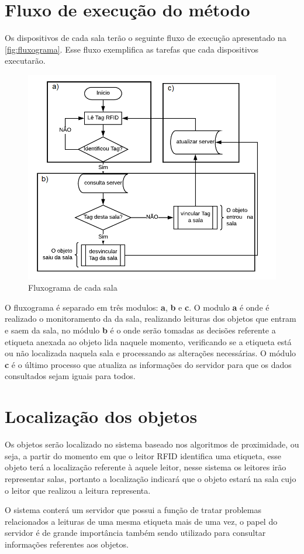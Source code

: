 \section{Fluxo de execução do método}
Os dispositivos de cada sala terão o seguinte fluxo de execução apresentado na \autoref{fig:fluxograma}. Esse fluxo exemplifica as tarefas que cada dispositivos executarão.
\begin{figure}[H]
              \caption{\label{fig:fluxograma}{Fluxograma de cada sala}}
              \centering
              \includegraphics[width=1\textwidth]{Figuras/fluxograma.png}
        \end{figure}
\par
O fluxograma é separado em três modulos: \textbf{a}, \textbf{b} e \textbf{c}. O modulo \textbf{a} é onde é realizado o monitoramento da da sala, realizando leituras dos objetos que entram e saem da sala, no módulo \textbf{b} é o onde serão tomadas as decisões referente a etiqueta anexada ao objeto lida naquele momento, verificando se a etiqueta está ou não localizada naquela sala e processando as alterações necessárias. O módulo \textbf{c} é o último processo que atualiza as informações do servidor para que os dados consultados sejam iguais para todos.
\section{Localização dos objetos}
Os objetos serão localizado no sistema baseado nos algoritmos de proximidade, ou seja, a partir do momento em que o leitor RFID identifica uma etiqueta, esse objeto terá a localização referente à aquele leitor, nesse sistema os leitores irão representar salas, portanto a localização indicará que o objeto estará na sala cujo o leitor que realizou a leitura representa.
\par
O sistema conterá um servidor que possui a função de tratar problemas relacionados a leituras de uma mesma etiqueta mais de uma vez, o papel do servidor é de grande importância também sendo utilizado para consultar informações referentes aos objetos. 


